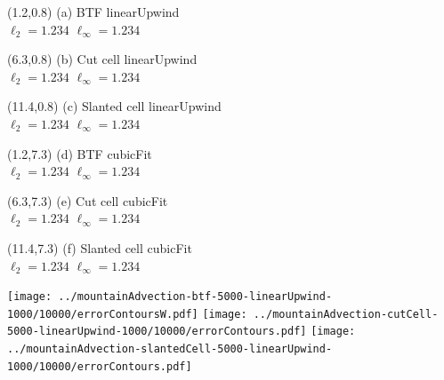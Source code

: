 \documentclass{article}
\begin{document}
\TPMargin{1pt}
\begin{textblock}{4}(1.2,0.8)
\normalsize
(a) BTF linearUpwind \\
\hspace*{1.4em}$\ell_2 = \num{1.234}$
\hspace*{1.4em}$\ell_\infty = \num{1.234}$
\end{textblock}
\begin{textblock}{4}(6.3,0.8)
\normalsize
(b) Cut cell linearUpwind \\
\hspace*{1.4em}$\ell_2 = \num{1.234}$
\hspace*{1.4em}$\ell_\infty = \num{1.234}$
\end{textblock}
\begin{textblock}{4}(11.4,0.8)
\normalsize
(c) Slanted cell linearUpwind \\
\hspace*{1.4em}$\ell_2 = \num{1.234}$
\hspace*{1.4em}$\ell_\infty = \num{1.234}$
\end{textblock}
\begin{textblock}{4}(1.2,7.3)
\normalsize
(d) BTF cubicFit \\
\hspace*{1.4em}$\ell_2 = \num{1.234}$
\hspace*{1.4em}$\ell_\infty = \num{1.234}$
\end{textblock}
\begin{textblock}{4}(6.3,7.3)
\normalsize
(e) Cut cell cubicFit \\
\hspace*{1.4em}$\ell_2 = \num{1.234}$
\hspace*{1.4em}$\ell_\infty = \num{1.234}$
\end{textblock}
\begin{textblock}{4}(11.4,7.3)
\normalsize
(f) Slanted cell cubicFit \\
\hspace*{1.4em}$\ell_2 = \num{1.234}$
\hspace*{1.4em}$\ell_\infty = \num{1.234}$
\end{textblock}
\texttt{[image: ../mountainAdvection-btf-5000-linearUpwind-1000/10000/errorContoursW.pdf]}
\hspace*{0.26em}
\texttt{[image: ../mountainAdvection-cutCell-5000-linearUpwind-1000/10000/errorContours.pdf]}
\hspace*{0.26em}
\texttt{[image: ../mountainAdvection-slantedCell-5000-linearUpwind-1000/10000/errorContours.pdf]} \\
\end{document}
